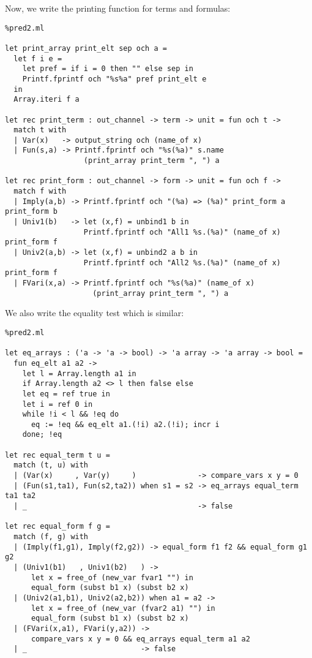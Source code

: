 \documentclass[11pt]{article}
\begin{document}
Now, we write the printing function for terms and formulas:

\begin{lstlisting}%pred2.ml

let print_array print_elt sep och a =
  let f i e =
    let pref = if i = 0 then "" else sep in
    Printf.fprintf och "%s%a" pref print_elt e
  in
  Array.iteri f a

let rec print_term : out_channel -> term -> unit = fun och t ->
  match t with
  | Var(x)   -> output_string och (name_of x)
  | Fun(s,a) -> Printf.fprintf och "%s(%a)" s.name
                  (print_array print_term ", ") a

let rec print_form : out_channel -> form -> unit = fun och f ->
  match f with
  | Imply(a,b) -> Printf.fprintf och "(%a) => (%a)" print_form a print_form b
  | Univ1(b)   -> let (x,f) = unbind1 b in
                  Printf.fprintf och "All1 %s.(%a)" (name_of x) print_form f
  | Univ2(a,b) -> let (x,f) = unbind2 a b in
                  Printf.fprintf och "All2 %s.(%a)" (name_of x) print_form f
  | FVari(x,a) -> Printf.fprintf och "%s(%a)" (name_of x)
                    (print_array print_term ", ") a
\end{lstlisting}

We also write the equality test which is similar:
\begin{lstlisting}%pred2.ml

let eq_arrays : ('a -> 'a -> bool) -> 'a array -> 'a array -> bool =
  fun eq_elt a1 a2 ->
    let l = Array.length a1 in
    if Array.length a2 <> l then false else
    let eq = ref true in
    let i = ref 0 in
    while !i < l && !eq do
      eq := !eq && eq_elt a1.(!i) a2.(!i); incr i
    done; !eq

let rec equal_term t u =
  match (t, u) with
  | (Var(x)     , Var(y)     )              -> compare_vars x y = 0
  | (Fun(s1,ta1), Fun(s2,ta2)) when s1 = s2 -> eq_arrays equal_term ta1 ta2
  | _                                       -> false

let rec equal_form f g =
  match (f, g) with
  | (Imply(f1,g1), Imply(f2,g2)) -> equal_form f1 f2 && equal_form g1 g2
  | (Univ1(b1)   , Univ1(b2)   ) ->
      let x = free_of (new_var fvar1 "") in
      equal_form (subst b1 x) (subst b2 x)
  | (Univ2(a1,b1), Univ2(a2,b2)) when a1 = a2 ->
      let x = free_of (new_var (fvar2 a1) "") in
      equal_form (subst b1 x) (subst b2 x)
  | (FVari(x,a1), FVari(y,a2)) ->
      compare_vars x y = 0 && eq_arrays equal_term a1 a2
  | _                          -> false
\end{lstlisting}
\end{document}
